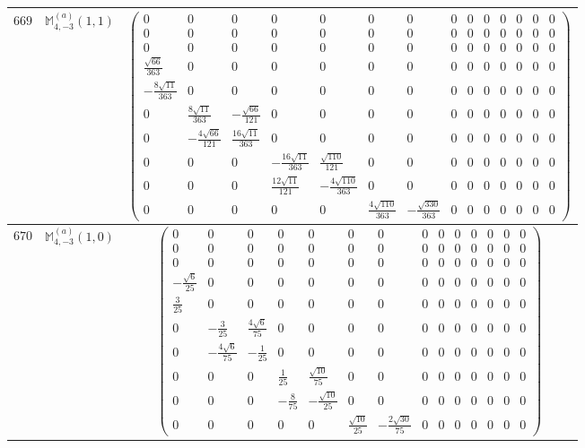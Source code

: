 \documentclass[fleqn,8pt,landscape]{jsarticle}
\begin{document}
\begin{center}
\begin{longtable}{ccc}
$ 669 $ & $ \mathbb{M}_{4,-3}^{(a)}(1,1) $ & $ \begin{pmatrix} 0 & 0 & 0 & 0 & 0 & 0 & 0 & 0 & 0 & 0 & 0 & 0 & 0 & 0 \\ 0 & 0 & 0 & 0 & 0 & 0 & 0 & 0 & 0 & 0 & 0 & 0 & 0 & 0 \\ 0 & 0 & 0 & 0 & 0 & 0 & 0 & 0 & 0 & 0 & 0 & 0 & 0 & 0 \\ \frac{\sqrt{66}}{363} & 0 & 0 & 0 & 0 & 0 & 0 & 0 & 0 & 0 & 0 & 0 & 0 & 0 \\ - \frac{8 \sqrt{11}}{363} & 0 & 0 & 0 & 0 & 0 & 0 & 0 & 0 & 0 & 0 & 0 & 0 & 0 \\ 0 & \frac{8 \sqrt{11}}{363} & - \frac{\sqrt{66}}{121} & 0 & 0 & 0 & 0 & 0 & 0 & 0 & 0 & 0 & 0 & 0 \\ 0 & - \frac{4 \sqrt{66}}{121} & \frac{16 \sqrt{11}}{363} & 0 & 0 & 0 & 0 & 0 & 0 & 0 & 0 & 0 & 0 & 0 \\ 0 & 0 & 0 & - \frac{16 \sqrt{11}}{363} & \frac{\sqrt{110}}{121} & 0 & 0 & 0 & 0 & 0 & 0 & 0 & 0 & 0 \\ 0 & 0 & 0 & \frac{12 \sqrt{11}}{121} & - \frac{4 \sqrt{110}}{363} & 0 & 0 & 0 & 0 & 0 & 0 & 0 & 0 & 0 \\ 0 & 0 & 0 & 0 & 0 & \frac{4 \sqrt{110}}{363} & - \frac{\sqrt{330}}{363} & 0 & 0 & 0 & 0 & 0 & 0 & 0 \end{pmatrix} $ \\ \hline
$ 670 $ & $ \mathbb{M}_{4,-3}^{(a)}(1,0) $ & $ \begin{pmatrix} 0 & 0 & 0 & 0 & 0 & 0 & 0 & 0 & 0 & 0 & 0 & 0 & 0 & 0 \\ 0 & 0 & 0 & 0 & 0 & 0 & 0 & 0 & 0 & 0 & 0 & 0 & 0 & 0 \\ 0 & 0 & 0 & 0 & 0 & 0 & 0 & 0 & 0 & 0 & 0 & 0 & 0 & 0 \\ - \frac{\sqrt{6}}{25} & 0 & 0 & 0 & 0 & 0 & 0 & 0 & 0 & 0 & 0 & 0 & 0 & 0 \\ \frac{3}{25} & 0 & 0 & 0 & 0 & 0 & 0 & 0 & 0 & 0 & 0 & 0 & 0 & 0 \\ 0 & - \frac{3}{25} & \frac{4 \sqrt{6}}{75} & 0 & 0 & 0 & 0 & 0 & 0 & 0 & 0 & 0 & 0 & 0 \\ 0 & - \frac{4 \sqrt{6}}{75} & - \frac{1}{25} & 0 & 0 & 0 & 0 & 0 & 0 & 0 & 0 & 0 & 0 & 0 \\ 0 & 0 & 0 & \frac{1}{25} & \frac{\sqrt{10}}{75} & 0 & 0 & 0 & 0 & 0 & 0 & 0 & 0 & 0 \\ 0 & 0 & 0 & - \frac{8}{75} & - \frac{\sqrt{10}}{25} & 0 & 0 & 0 & 0 & 0 & 0 & 0 & 0 & 0 \\ 0 & 0 & 0 & 0 & 0 & \frac{\sqrt{10}}{25} & - \frac{2 \sqrt{30}}{75} & 0 & 0 & 0 & 0 & 0 & 0 & 0 \end{pmatrix} $ \\ \hline

\end{longtable}
\end{center}
\end{document}
